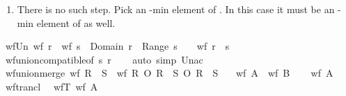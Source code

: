 \begin{isabellebody}
\begin{isamarkuptext}
\begin{enumerate}
\item There is no such step.
Pick an -min element of . In this case it must be an -min
element of  as well.%
\end{enumerate}%
\end{isamarkuptext}\isamarkuptrue%
\isamarkupfalse%
\ wf{\isacharunderscore}{\kern0pt}Un{\isacharcolon}{\kern0pt}\ {\isachardoublequoteopen}wf\ r\ {\isasymLongrightarrow}\ wf\ s\ {\isasymLongrightarrow}\ Domain\ r\ {\isasyminter}\ Range\ s\ {\isacharequal}{\kern0pt}\ {\isacharbraceleft}{\kern0pt}{\isacharbraceright}{\kern0pt}\ {\isasymLongrightarrow}\ wf\ {\isacharparenleft}{\kern0pt}r\ {\isasymunion}\ s{\isacharparenright}{\kern0pt}{\isachardoublequoteclose}\isanewline
%
\isadelimproof
\ \ %
\endisadelimproof
%
\isatagproof
{}\isamarkupfalse%
\ wf{\isacharunderscore}{\kern0pt}union{\isacharunderscore}{\kern0pt}compatible{\isacharbrackleft}{\kern0pt}of\ s\ r{\isacharbrackright}{\kern0pt}\isanewline
\ \ \isamarkupfalse%
\ {\isacharparenleft}{\kern0pt}auto\ simp{\isacharcolon}{\kern0pt}\ Un{\isacharunderscore}{\kern0pt}ac{\isacharparenright}{\kern0pt}%
\endisatagproof
{\isafoldproof}%
%
\isadelimproof
\isanewline
%
\endisadelimproof
\isanewline
{}\isamarkupfalse%
\ wf{\isacharunderscore}{\kern0pt}union{\isacharunderscore}{\kern0pt}merge{\isacharcolon}{\kern0pt}\ {\isachardoublequoteopen}wf\ {\isacharparenleft}{\kern0pt}R\ {\isasymunion}\ S{\isacharparenright}{\kern0pt}\ {\isacharequal}{\kern0pt}\ wf\ {\isacharparenleft}{\kern0pt}R\ O\ R\ {\isasymunion}\ S\ O\ R\ {\isasymunion}\ S{\isacharparenright}{\kern0pt}{\isachardoublequoteclose}\isanewline
\ \ {\isacharparenleft}{\kern0pt}\ {\isachardoublequoteopen}wf\ {\isacharquery}{\kern0pt}A\ {\isacharequal}{\kern0pt}\ wf\ {\isacharquery}{\kern0pt}B{\isachardoublequoteclose}{\isacharparenright}{\kern0pt}\isanewline
%
\isadelimproof
%
\endisadelimproof
%
\isatagproof
{}\isamarkupfalse%
\isanewline
\ \ \isamarkupfalse%
\ {\isachardoublequoteopen}wf\ {\isacharquery}{\kern0pt}A{\isachardoublequoteclose}\isanewline
\ \ \isamarkupfalse%
\ wf{\isacharunderscore}{\kern0pt}trancl\ \isamarkupfalse%
\ wfT{\isacharcolon}{\kern0pt}\ {\isachardoublequoteopen}wf\ {\isacharparenleft}{\kern0pt}{\isacharquery}{\kern0pt}A\isactrlsup {\isacharplus}{\kern0pt}{\isacharparenright}{\kern0pt}{\isachardoublequoteclose}\ \isacommand{{\isachardot}{\kern0pt}}\isamarkupfalse%
\isanewline
\ \ \isamarkupfalse%

\end{isabellebody}
